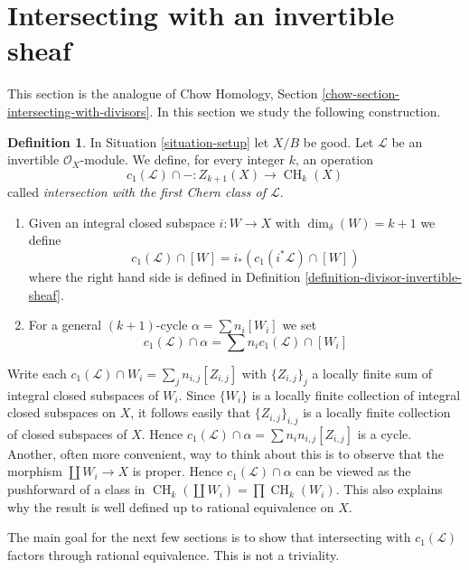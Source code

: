 \documentclass{stacks-project}
\theoremstyle{plain}
\theoremstyle{definition}
\newtheorem{definition}[subsection]{Definition}
\theoremstyle{remark}
\numberwithin{equation}{subsection}
\def\CH{\mathop{\mathrm{CH}}\nolimits}
\begin{document}
\section{Intersecting with an invertible sheaf}
\label{section-intersecting-with-divisors}

\noindent
This section is the analogue of
Chow Homology, Section \ref{chow-section-intersecting-with-divisors}.
In this section we study the following construction.

\begin{definition}
\label{definition-cap-c1}
In Situation \ref{situation-setup} let $X/B$ be good.
Let $\mathcal{L}$ be an invertible $\mathcal{O}_X$-module.
We define, for every integer $k$, an operation
$$
c_1(\mathcal{L}) \cap - :
Z_{k + 1}(X) \to \CH_k(X)
$$
called {\it intersection with the first Chern class of $\mathcal{L}$}.
\begin{enumerate}
\item Given an integral closed subspace $i : W \to X$ with
$\dim_\delta(W) = k + 1$ we define
$$
c_1(\mathcal{L}) \cap [W] = i_*(c_1({i^*\mathcal{L}}) \cap [W])
$$
where the right hand side is defined in
Definition \ref{definition-divisor-invertible-sheaf}.
\item For a general $(k + 1)$-cycle $\alpha = \sum n_i [W_i]$ we set
$$
c_1(\mathcal{L}) \cap \alpha = \sum n_i c_1(\mathcal{L}) \cap [W_i]
$$
\end{enumerate}
\end{definition}

\noindent
Write each $c_1(\mathcal{L}) \cap W_i = \sum_j n_{i, j} [Z_{i, j}]$
with $\{Z_{i, j}\}_j$ a locally finite sum
of integral closed subspaces of $W_i$. Since $\{W_i\}$ is a locally
finite collection of integral closed subspaces on $X$, it follows
easily that $\{Z_{i, j}\}_{i, j}$ is a locally finite collection
of closed subspaces of $X$. Hence
$c_1(\mathcal{L}) \cap \alpha = \sum n_in_{i, j}[Z_{i, j}]$
is a cycle. Another, often more convenient, way to think about this
is to observe that the morphism $\coprod W_i \to X$ is
proper. Hence $c_1(\mathcal{L}) \cap \alpha$ can be viewed
as the pushforward of a class in $\CH_k(\coprod W_i) = \prod \CH_k(W_i)$.
This also explains why the result is well defined up to rational
equivalence on $X$.

\medskip\noindent
The main goal for the next few sections is to show that intersecting with
$c_1(\mathcal{L})$ factors through rational equivalence.
This is not a triviality.
\end{document}
